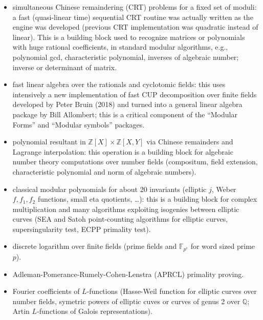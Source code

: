 \documentclass{deliverablereport}
\begin{document}
\begin{itemize}
\item simultaneous Chinese remaindering (CRT) problems for a fixed set of
  moduli: a fast (quasi-linear time) sequential CRT routine was actually
  written as the engine was developed (previous CRT implementation was
  quadratic instead of linear). This is a building block used to recognize
  matrices or polynomials with huge rational coefficients, in standard
  modular algorithms, e.g., polynomial gcd, characteristic polynomial,
  inverses of algebraic number; inverse or determinant of matrix.

\item fast linear algebra over the rationals and cyclotomic fields: this uses
  intensively a new implementation of fast CUP decomposition over finite
  fields developed by Peter Bruin (2018) and turned into a general linear
  algebra package by Bill Allombert; this is a critical component of
  the ``Modular Forms'' and ``Modular symbols'' packages.

\item polynomial resultant in $\mathbb{Z}[X] \times \mathbb{Z}[X,Y]$
  via Chinese remainders and Lagrange interpolation: this operation is a
  building block for algebraic number theory computations over number
  fields (compositum, field extension, characteristic polynomial and norm
  of algebraic numbers).

\item classical modular polynomials for about 20 invariants
  (elliptic $j$, Weber $f,f_1,f_2$ functions, small eta quotients, \dots):
    this is a building block for complex multiplication and many algorithms
    exploiting isogenies between elliptic curves (SEA and Satoh point-counting
    algorithms for elliptic curves, supersingularity test, ECPP primality test).

\item discrete logarithm over finite fields (prime fields and
  $\mathbb{F}_{p^e}$ for word sized prime $p$).

\item Adleman-Pomerance-Rumely-Cohen-Lenstra (APRCL) primality proving.

\item Fourier coefficients of $L$-functions (Hasse-Weil function for
  elliptic curves over number fields, symetric powers of elliptic cuves or
  curves of genus 2 over $\mathbb{Q}$; Artin $L$-functions of Galois
  representations).
\end{itemize}
\end{document}
